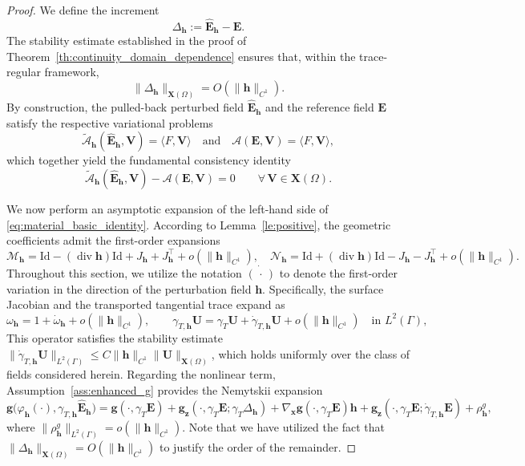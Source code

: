 \documentclass[10pt,a4paper]{amsart}
\numberwithin{equation}{section}
\begin{document}
\begin{proof}
We define the increment 
\[
\Delta_{\mathbf{h}} := \hat{\mathbf{E}}_{\mathbf{h}} - \mathbf{E}.
\]
The stability estimate established in the proof of Theorem~\ref{th:continuity_domain_dependence} ensures that, within the trace-regular framework, 
\[
\|\Delta_{\mathbf{h}}\|_{\mathbf{X}(\Omega)} = O(\|\mathbf{h}\|_{C^1}).
\]
By construction, the pulled-back perturbed field $\hat{\mathbf{E}}_{\mathbf{h}}$ and the reference field $\mathbf{E}$ satisfy the respective variational problems
\[
\widetilde{\mathcal{A}}_{\mathbf{h}}(\hat{\mathbf{E}}_{\mathbf{h}}, \mathbf{V}) = \langle {F}, \mathbf{V} \rangle \quad \text{and} \quad \mathcal{A}(\mathbf{E}, \mathbf{V}) = \langle {F}, \mathbf{V} \rangle,
\]
which together yield the fundamental consistency identity
\begin{equation}\label{eq:material_basic_identity}
\widetilde{\mathcal{A}}_{\mathbf{h}}(\hat{\mathbf{E}}_{\mathbf{h}}, \mathbf{V}) - \mathcal{A}(\mathbf{E}, \mathbf{V}) = 0 \qquad \forall \, \mathbf{V} \in \mathbf{X}(\Omega).
\end{equation}

We now perform an asymptotic expansion of the left-hand side of \eqref{eq:material_basic_identity}. According to Lemma~\ref{le:positive}, the geometric coefficients admit the first-order expansions
\[
\mathcal{M}_{\mathbf{h}} = \mathrm{Id} - (\operatorname{div} \mathbf{h})\mathrm{Id} + J_{\mathbf{h}} + J_{\mathbf{h}}^{\top} + o(\|\mathbf{h}\|_{C^1}), \quad \mathcal{N}_{\mathbf{h}} = \mathrm{Id} + (\operatorname{div} \mathbf{h})\mathrm{Id} - J_{\mathbf{h}} - J_{\mathbf{h}}^{\top} + o(\|\mathbf{h}\|_{C^1}).
\]
Throughout this section, we utilize the notation $\dot{(\,\cdot\,)}$ to denote the first-order  variation in the direction of the perturbation field $\mathbf{h}$. Specifically, the surface Jacobian and the transported tangential trace expand as
\[
\omega_{\mathbf{h}} = 1 + \dot{\omega}_{\mathbf{h}} + o(\|\mathbf{h}\|_{C^1}), \qquad \gamma_{T,\mathbf{h}}\mathbf{U} = \gamma_T\mathbf{U} + \dot{\gamma}_{T,\mathbf{h}}\mathbf{U} + o(\|\mathbf{h}\|_{C^1}) \quad \text{in } L^2(\Gamma),
\]
This operator satisfies the stability estimate $\|\dot{\gamma}_{T,\mathbf{h}}\mathbf{U}\|_{L^2(\Gamma)} \le C \|\mathbf{h}\|_{C^1} \|\mathbf{U}\|_{\mathbf{X}(\Omega)}$, which holds uniformly over the class of fields considered herein. Regarding the nonlinear term, Assumption~\ref{ass:enhanced_g} provides the Nemytskii expansion
\[
\mathbf{g}\bigl( \varphi_{\mathbf{h}}(\cdot), \gamma_{T,\mathbf{h}}\hat{\mathbf{E}}_{\mathbf{h}} \bigr) = \mathbf{g}(\cdot, \gamma_T\mathbf{E}) + \mathbf{g}_{\boldsymbol{z}}(\cdot, \gamma_T\mathbf{E}; \gamma_T\Delta_{\mathbf{h}}) + \nabla_{\boldsymbol{x}}\mathbf{g}(\cdot, \gamma_T\mathbf{E})\mathbf{h} + \mathbf{g}_{\boldsymbol{z}}(\cdot, \gamma_T\mathbf{E}; \dot{\gamma}_{T,\mathbf{h}}\mathbf{E}) + \rho_{\mathbf{h}}^{g},
\]
where $\|\rho_{\mathbf{h}}^{g}\|_{L^2(\Gamma)} = o(\|\mathbf{h}\|_{C^1})$. Note that we have utilized the fact that $\|\Delta_{\mathbf{h}}\|_{\mathbf{X}(\Omega)} = O(\|\mathbf{h}\|_{C^1})$ to justify the order of the remainder.


\end{proof}
\end{document}
